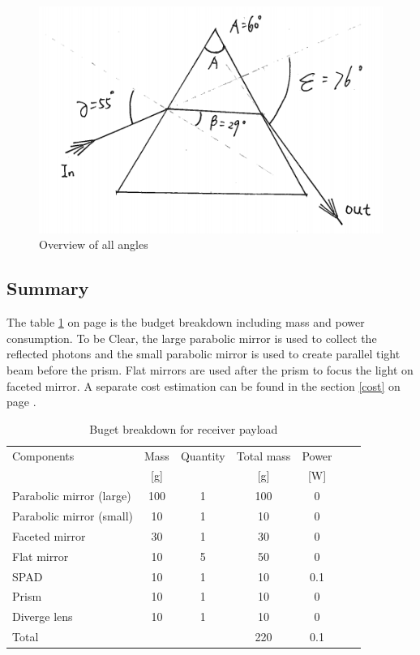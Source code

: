 \begin{figure}[ht!]
\centering
\includegraphics[scale = 0.8]{chapters/img/prism_final.png}
\caption{Overview of all angles}
\label{fig:prism_final}
\end{figure}

\subsection{Summary}
\label{sum}
The table \ref{tab:receiverbudget} on page \pageref{tab:receiverbudget} is the budget breakdown including mass and power consumption. To be Clear, the large parabolic mirror is used to collect the reflected photons and the small parabolic mirror is used to create parallel tight beam before the prism. Flat mirrors are used after the prism to focus the light on faceted mirror. A separate cost estimation can be found in the section \ref{cost} on page \pageref{}.

\begin{table}[ht!]
\centering
\begin{tabular}{l | c | c c | c c | c }
Components                & Mass  & Quantity & Total mass & Power\\ 
                          &  [g]  &          &     [g]    &  [W] \\\hline\hline
Parabolic mirror (large)  &  100  &     1    &     100    &   0   \\
Parabolic mirror (small)  &  10   &     1    &     10     &   0   \\
Faceted mirror            &  30   &     1    &     30     &   0   \\ 
Flat mirror               &  10   &     5    &     50     &   0   \\
\acs{SPAD}                &  10   &     1    &     10     &   0.1 \\
Prism                     &  10   &     1    &     10     &   0   \\ 
Diverge lens              &  10   &     1    &     10     &   0   \\ \hline
Total                     &       &          &     220    &   0.1 \\
\end{tabular}
\caption{Buget breakdown for receiver payload}
\label{tab:receiverbudget}
\end{table}


